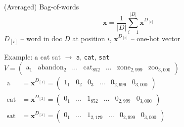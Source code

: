\documentclass[12pt,aspectratio=169,handout]{beamer}
\begin{document}
\begin{frame}{(Averaged) Bag-of-words}
$$
\bm{x} = \frac{1}{|D|} \sum_{i =1}^{|D|} \bm{x}^{D_{[i]}}
$$
$D_{[i]}$ -- word in doc $D$ at position $i$, $\bm{x}^{D_{[i]}}$ -- one-hot vector

\begin{block}{Example: a cat sat $\to$ \texttt{a}, \texttt{cat}, \texttt{sat}}
$
V = \begin{pmatrix}
	\text{a}_1 & \text{abandon}_2 & \ldots & \text{cat}_{852} & \ldots & \text{zone}_{2,999} & \text{zoo}_{3,000}
\end{pmatrix}
$
$
\begin{aligned}
\text{a} & = \bm{x}^{D_{[1]}} =
\begin{pmatrix}
1_1 & 0_2 & 0_3 & \ldots & 0_{2,999} & 0_{3,000}
\end{pmatrix} \\
\text{cat} &= \bm{x}^{D_{[2]}} =
\begin{pmatrix}
0_1 & \ldots & 1_{852} & \ldots & 0_{2,999} & 0_{3,000}
\end{pmatrix} \\
\text{sat} &= \bm{x}^{D_{[3]}} =
\begin{pmatrix}
0_1 & \ldots & 1_{2,179} & \ldots & 0_{2,999} & 0_{3,000}
\end{pmatrix}
\end{aligned}
$



	
\end{block}

	
\end{frame}
\end{document}
